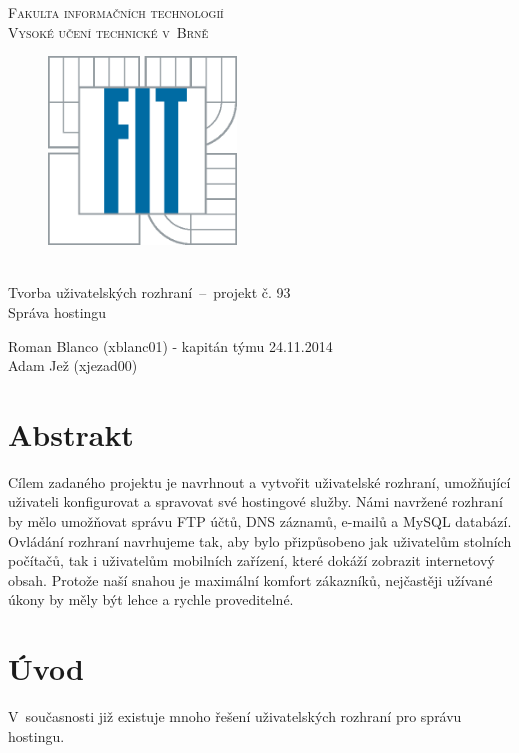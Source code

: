 \documentclass[11pt,a4paper]{article}
\begin{document}
  \begin{titlepage}
    \begin{center}
      \Huge
      \textsc{Fakulta informačních technologií \\ Vysoké učení technické v~Brně}
      \vspace{100px}
      \begin{figure}[!h]
        \centering
        \includegraphics[height=5cm]{logo}
      \end{figure}
      \\[50mm]
      \LARGE{Tvorba uživatelských rozhraní \,--\, projekt č. 93 \\
             Správa hostingu}
      \vfill
    \end{center}
    \Large{Roman Blanco (xblanc01) - kapitán týmu \hfill 24.11.2014 \\
           Adam Jež (xjezad00)}

  \end{titlepage}

  \section{Abstrakt}

    Cílem zadaného projektu je navrhnout a vytvořit uživatelské rozhraní,
    umožňující uživateli konfigurovat a spravovat své hostingové služby.
    Námi navržené rozhraní by mělo umožňovat správu FTP účtů, DNS
    záznamů, e-mailů a MySQL databází. Ovládání rozhraní navrhujeme tak, aby
    bylo přizpůsobeno jak uživatelům stolních počítačů, tak i uživatelům
    mobilních zařízení, které dokáží zobrazit internetový obsah. Protože naší
    snahou je maximální komfort zákazníků, nejčastěji užívané úkony by měly
    být lehce a rychle proveditelné.

  \section{Úvod}

    V~současnosti již existuje mnoho řešení uživatelských rozhraní pro správu
    hostingu.
\end{document}
